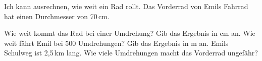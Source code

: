 \begin{aufgabe}{Ich kann ausrechnen, wie weit ein Rad rollt. Das Vorderrad von Emils Fahrrad hat einen Durchmesser von 70\,cm.}
\begin{teile}
\teil Wie weit kommt das Rad bei einer Umdrehung? Gib das Ergebnis in cm an.
\teil Wie weit fährt Emil bei 500 Umdrehungen? Gib das Ergebnis in m an.
\teil Emils Schulweg ist 2,5\,km lang. Wie viele Umdrehungen macht das Vorderrad ungefähr?
\end{teile}
\end{aufgabe}
